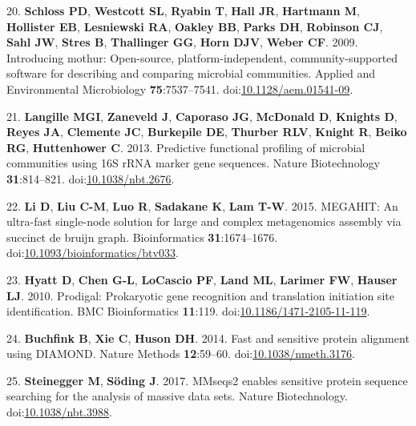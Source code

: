 \documentclass[11pt,]{article}
\begin{document}
\leavevmode\hypertarget{ref-Schloss2009}{}%
20. \textbf{Schloss PD}, \textbf{Westcott SL}, \textbf{Ryabin T},
\textbf{Hall JR}, \textbf{Hartmann M}, \textbf{Hollister EB},
\textbf{Lesniewski RA}, \textbf{Oakley BB}, \textbf{Parks DH},
\textbf{Robinson CJ}, \textbf{Sahl JW}, \textbf{Stres B},
\textbf{Thallinger GG}, \textbf{Horn DJV}, \textbf{Weber CF}. 2009.
Introducing mothur: Open-source, platform-independent,
community-supported software for describing and comparing microbial
communities. Applied and Environmental Microbiology
\textbf{75}:7537--7541.
doi:\href{https://doi.org/10.1128/aem.01541-09}{10.1128/aem.01541-09}.

\leavevmode\hypertarget{ref-Langille2013}{}%
21. \textbf{Langille MGI}, \textbf{Zaneveld J}, \textbf{Caporaso JG},
\textbf{McDonald D}, \textbf{Knights D}, \textbf{Reyes JA},
\textbf{Clemente JC}, \textbf{Burkepile DE}, \textbf{Thurber RLV},
\textbf{Knight R}, \textbf{Beiko RG}, \textbf{Huttenhower C}. 2013.
Predictive functional profiling of microbial communities using 16S rRNA
marker gene sequences. Nature Biotechnology \textbf{31}:814--821.
doi:\href{https://doi.org/10.1038/nbt.2676}{10.1038/nbt.2676}.

\leavevmode\hypertarget{ref-Li2015}{}%
22. \textbf{Li D}, \textbf{Liu C-M}, \textbf{Luo R}, \textbf{Sadakane
K}, \textbf{Lam T-W}. 2015. MEGAHIT: An ultra-fast single-node solution
for large and complex metagenomics assembly via succinct de bruijn
graph. Bioinformatics \textbf{31}:1674--1676.
doi:\href{https://doi.org/10.1093/bioinformatics/btv033}{10.1093/bioinformatics/btv033}.

\leavevmode\hypertarget{ref-Hyatt2010}{}%
23. \textbf{Hyatt D}, \textbf{Chen G-L}, \textbf{LoCascio PF},
\textbf{Land ML}, \textbf{Larimer FW}, \textbf{Hauser LJ}. 2010.
Prodigal: Prokaryotic gene recognition and translation initiation site
identification. BMC Bioinformatics \textbf{11}:119.
doi:\href{https://doi.org/10.1186/1471-2105-11-119}{10.1186/1471-2105-11-119}.

\leavevmode\hypertarget{ref-Buchfink2014}{}%
24. \textbf{Buchfink B}, \textbf{Xie C}, \textbf{Huson DH}. 2014. Fast
and sensitive protein alignment using DIAMOND. Nature Methods
\textbf{12}:59--60.
doi:\href{https://doi.org/10.1038/nmeth.3176}{10.1038/nmeth.3176}.

\leavevmode\hypertarget{ref-Steinegger2017}{}%
25. \textbf{Steinegger M}, \textbf{Söding J}. 2017. MMseqs2 enables
sensitive protein sequence searching for the analysis of massive data
sets. Nature Biotechnology.
doi:\href{https://doi.org/10.1038/nbt.3988}{10.1038/nbt.3988}.
\end{document}
